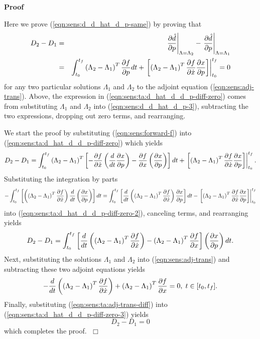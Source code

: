 \documentclass[pdf,ps2pdf,11pt]{SANDreport}
\begin{document}
\textbf{Proof}

Here we prove (\ref{eqn:sens:d_d_hat_d_p-same}) by proving that
%
\begin{eqnarray}
D_2 - D_1
& = &
\left.\displaystyle{\frac{\partial \hat{d}}{\partial p}}\right|_{\Lambda=\Lambda_2} - \left.\displaystyle{\frac{\partial \hat{d}}{\partial p}}\right|_{\Lambda=\Lambda_1}
\nonumber \\
& = &
\int_{t_0}^{t_f} \left( \Lambda_2 - \Lambda_1 \right)^T \displaystyle{\frac{\partial f}{\partial p}} dt
+ \left.\left[ \left( \Lambda_2 - \Lambda_1 \right)^T \displaystyle{\frac{\partial f}{\partial \dot{x}}} \displaystyle{\frac{\partial x}{\partial p}} \right]\right|_{t_0}^{t_f}
= 0
\label{eqn:sens:ta:d_hat_d_d_p-diff-zero}
\end{eqnarray}
%
for any two particular solutions $\Lambda_1$ and $\Lambda_2$ to the adjoint
equation (\ref{eqn:sens:adj-trans}).  Above, the expression in
(\ref{eqn:sens:ta:d_hat_d_d_p-diff-zero}) comes from substituting $\Lambda_1$
and $\Lambda_2$ into (\ref{eqn:sens:d_d_hat_d_p-3}), subtracting the two
expressions, dropping out zero terms, and rearranging.

We start the proof by substituting (\ref{eqn:sens:forward-f}) into
(\ref{eqn:sens:ta:d_hat_d_d_p-diff-zero}) which yields
%
\begin{equation}
D_2 - D_1 = 
\int_{t_0}^{t_f} \left( \Lambda_2 - \Lambda_1 \right)^T \left[
  - \displaystyle{\frac{\partial f}{\partial \dot{x}}} \left(\frac{d}{dt} \displaystyle{\frac{\partial x}{\partial p}} \right) - \displaystyle{\frac{\partial f}{\partial x}} \left(\displaystyle{\frac{\partial x}{\partial p}}\right) \right] dt
+ \left.\left[ \left( \Lambda_2 - \Lambda_1 \right)^T \displaystyle{\frac{\partial f}{\partial \dot{x}}} \displaystyle{\frac{\partial x}{\partial p}} \right]\right|_{t_0}^{t_f}.
\label{eqn:sens:ta:d_hat_d_d_p-diff-zero-2}
\end{equation}
%
Substituting the integration by parts
%
\[
- \int_{t_0}^{t_f} \left[ \left( \left( \Lambda_2 - \Lambda_1 \right)^T \displaystyle{\frac{\partial f}{\partial \dot{x}}} \right) \frac{d}{dt}\left( \displaystyle{\frac{\partial x}{\partial p}} \right) \right] dt
= \int_{t_0}^{t_f} \left[ \frac{d}{dt}\left( \left( \Lambda_2 - \Lambda_1 \right)^T  \displaystyle{\frac{\partial f}{\partial \dot{x}}} \right) \displaystyle{\frac{\partial x}{\partial p}} \right] dt
- \left. \left[ \left( \Lambda_2 - \Lambda_1 \right)^T  \displaystyle{\frac{\partial f}{\partial \dot{x}}} \displaystyle{\frac{\partial x}{\partial p}} \right] \right|_{t_0}^{t_f}
\]
%
into (\ref{eqn:sens:ta:d_hat_d_d_p-diff-zero-2}), canceling
terms, and rearranging yields
%
\begin{equation}
D_2 - D_1 = 
\int_{t_0}^{t_f} \left[ \frac{d}{dt} \left( \left( \Lambda_2 - \Lambda_1 \right)^T \displaystyle{\frac{\partial f}{\partial \dot{x}}} \right)
- \left( \Lambda_2 - \Lambda_1 \right)^T \displaystyle{\frac{\partial f}{\partial x}} \right] \left(\displaystyle{\frac{\partial x}{\partial p}}\right) dt.
\label{eqn:sens:ta:d_hat_d_d_p-diff-zero-3}
\end{equation}
%
Next, substituting the solutions $\Lambda_1$ and $\Lambda_2$ into
(\ref{eqn:sens:adj-trans}) and subtracting these two adjoint
equations yields
%
\begin{equation}
- \frac{d}{dt} \left( \left( \Lambda_2 - \Lambda_1 \right)^T \displaystyle{\frac{\partial f}{\partial \dot{x}}} \right)
+ \left( \Lambda_2 - \Lambda_1 \right)^T \displaystyle{\frac{\partial f}{\partial x}} = 0, \; t \in [t_0,t_f].
\label{eqn:sens:ta:adj-trans-diff}
\end{equation}
%
Finally, substituting (\ref{eqn:sens:ta:adj-trans-diff}) into
(\ref{eqn:sens:ta:d_hat_d_d_p-diff-zero-3}) yields
%
\begin{equation}
D_2 - D_1 = 0
\label{eqn:sens:ta:d_hat_d_d_p-diff-zero-final}
\end{equation}
%
which completes the proof. $\;\Box$
\end{document}
